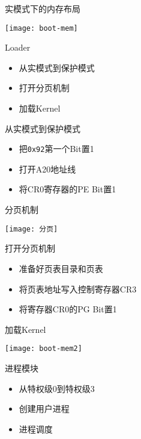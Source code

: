 \documentclass{swfubeamer}
\begin{document}
\begin{frame}{实模式下的内存布局}
  \begin{center}
    \texttt{[image: boot-mem]}
  \end{center}
\end{frame}

\begin{frame}{Loader}
  \begin{itemize}
  \item 从实模式到保护模式
  \item 打开分页机制
  \item 加载Kernel
  \end{itemize}
\end{frame}

\begin{frame}{从实模式到保护模式}
  \begin{itemize}
  \item 把\texttt{0x92}第一个Bit置1
  \item 打开A20地址线
  \item 将CR0寄存器的PE Bit置1
  \end{itemize}
\end{frame}

\begin{frame}{分页机制}
  \begin{center}
    \texttt{[image: 分页]}
  \end{center}
\end{frame}

\begin{frame}{打开分页机制}
  \begin{itemize}
  \item 准备好页表目录和页表
  \item 将页表地址写入控制寄存器CR3
  \item 将寄存器CR0的PG Bit置1
  \end{itemize}
\end{frame}

\begin{frame}{加载Kernel}
  \begin{center}
    \texttt{[image: boot-mem2]}
  \end{center}
\end{frame}

\begin{frame}{进程模块}
  \begin{itemize}
  \item 从特权级0到特权级3
  \item 创建用户进程
  \item 进程调度
  \end{itemize}
\end{frame}
\end{document}
